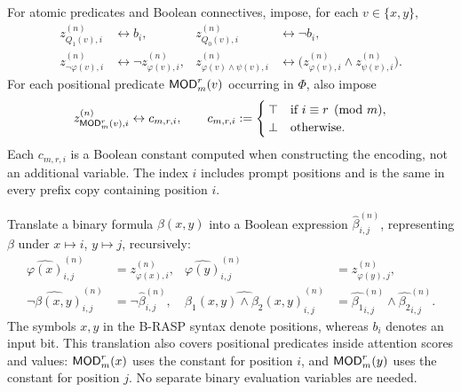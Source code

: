 \documentclass[acmsmall,screen,review,anonymous,nonacm]{PLDI/acmart}
\begin{document}
For atomic predicates and Boolean connectives, impose, for each
$v\in\{x,y\}$,
\begin{align*}
z^{(n)}_{Q_1(v),i}&\leftrightarrow b_i,&
z^{(n)}_{Q_0(v),i}&\leftrightarrow\neg b_i,\\
z^{(n)}_{\neg\varphi(v),i}&\leftrightarrow\neg z^{(n)}_{\varphi(v),i},&
z^{(n)}_{\varphi(v)\wedge\psi(v),i}&\leftrightarrow
\bigl(z^{(n)}_{\varphi(v),i}\wedge z^{(n)}_{\psi(v),i}\bigr).
\end{align*}
For each positional predicate $\mathsf{MOD}_m^r(v)$ occurring in $\Phi$,
also impose
\[
z^{(n)}_{\mathsf{MOD}_m^r(v),i}\leftrightarrow c_{m,r,i},
\qquad
c_{m,r,i}:=
\begin{cases}
\top & \text{if } i\equiv r\pmod m,\\
\bot & \text{otherwise}.
\end{cases}
\]
Each $c_{m,r,i}$ is a Boolean constant computed when constructing the
encoding, not an additional variable. The index $i$ includes prompt
positions and is the same in every prefix copy containing position $i$.

Translate a binary formula $\beta(x,y)$ into a Boolean expression
$\widehat\beta^{(n)}_{i,j}$, representing $\beta$ under $x\mapsto i$,
$y\mapsto j$, recursively:
\begin{align*}
\widehat{\varphi(x)}^{(n)}_{i,j}&=z^{(n)}_{\varphi(x),i},&
\widehat{\varphi(y)}^{(n)}_{i,j}&=z^{(n)}_{\varphi(y),j},\\
\widehat{\neg\beta(x,y)}^{(n)}_{i,j}&=\neg\widehat\beta^{(n)}_{i,j},&
\widehat{\beta_1(x,y)\wedge\beta_2(x,y)}^{(n)}_{i,j}
&=\widehat{\beta_1}^{(n)}_{i,j}\wedge\widehat{\beta_2}^{(n)}_{i,j}.
\end{align*}
The symbols $x,y$ in the B-RASP syntax denote positions, whereas
$b_i$ denotes an input bit. This translation also covers positional
predicates inside attention scores and values: $\mathsf{MOD}_m^r(x)$ uses
the constant for position $i$, and $\mathsf{MOD}_m^r(y)$ uses the constant
for position $j$. No separate binary evaluation variables are needed.
\end{document}
